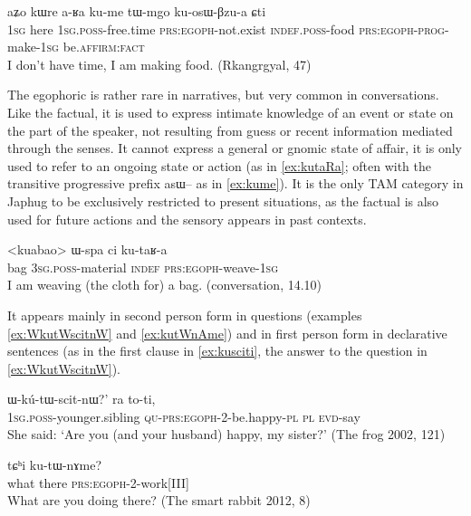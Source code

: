 \documentclass[oldfontcommands,oneside,a4paper,11pt]{article}
\newcommand{\ipa}[1]{{\phon \mbox{#1}}} %
\newcommand{\factual}[1]{\textsc{:fact}}
\begin{document}
\begin{exe}
\ex \label{ex:kume}
\gll 
\ipa{aʑo}  	\ipa{kɯre}  	\ipa{a-ʁa}  	\ipa{ku-me}  \ipa{tɯ-mgo} 	\ipa{ku-osɯ-βzu-a} 	\ipa{ɕti} 	  	\\
\textsc{1sg} here \textsc{1sg.poss}-free.time \textsc{prs:egoph}-not.exist \textsc{indef.poss}-food \textsc{prs:egoph}-\textsc{prog}-make-\textsc{1sg} be.\textsc{affirm}\factual{}  \\
\glt I don't have time, I am making food.  (Rkangrgyal, 47)
\end{exe}

The egophoric  is rather rare in narratives, but very common in conversations. Like the factual, it is used to express intimate knowledge of an event or state on the part of the speaker, not resulting from guess or recent information mediated through the senses. It cannot express a general or gnomic state of affair, it is only used to refer to an ongoing state or action (as in \ref{ex:kutaRa}; often with the transitive progressive prefix \ipa{asɯ--} as in \ref{ex:kume}). It is the only TAM category in Japhug to be exclusively restricted to present situations, as the factual is also used for future actions and the sensory appears in past contexts.

\begin{exe}
\ex \label{ex:kutaRa}
\gll 
<kuabao> 	\ipa{ɯ-spa}  	\ipa{ci}  	\ipa{ku-taʁ-a}  \\
bag \textsc{3sg.poss}-material \textsc{indef} \textsc{prs:egoph}-weave-\textsc{1sg} \\
\glt I am weaving (the cloth for) a bag. (conversation, 14.10)
\end{exe}


It appears mainly  in second person form in questions (examples \ref{ex:WkutWscitnW} and \ref{ex:kutWnAme}) and in first person form in declarative sentences (as in the first clause in \ref{ex:kusciti}, the answer to the question in \ref{ex:WkutWscitnW}).  

\begin{exe}
\ex \label{ex:WkutWscitnW}
\gll  \ipa{`a-ʁi} 			\ipa{ɯ-kú-tɯ-scit-nɯ?}' 	\ipa{ra} 	\ipa{to-ti,} \\
\textsc{1sg.poss}-younger.sibling  \textsc{qu-prs:egoph}-2-be.happy-\textsc{pl} \textsc{pl} \textsc{evd}-say \\
\glt She said: `Are you (and your husband) happy, my sister?' (The frog 2002, 121)
\end{exe}

\begin{exe}
\ex \label{ex:kutWnAme}
\gll \ipa{nɯtɕu}  \ipa{tɕʰi} \ipa{ku-tɯ-nɤme?}\\
what there \textsc{prs:egoph}-2-work[III] \\
\glt What are you doing there? (The smart rabbit 2012, 8)
\end{exe}
 
\end{document}
